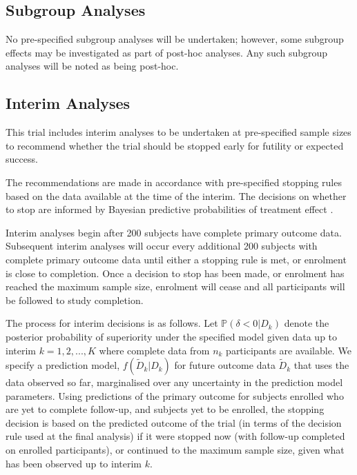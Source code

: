 \documentclass{bmcart}
\begin{document}
\subsection*{Subgroup Analyses}

No pre-specified subgroup analyses will be undertaken; however, some subgroup effects may be investigated as part of post-hoc analyses.
Any such subgroup analyses will be noted as being post-hoc.

\subsection*{Interim Analyses}

This trial includes interim analyses to be undertaken at pre-specified sample sizes to recommend whether the trial should be stopped early for futility or expected success.

The recommendations are made in accordance with pre-specified stopping rules based on the data available at the time of the interim.
The decisions on whether to stop are informed by Bayesian predictive probabilities of treatment effect \cite{spiegelhalter2004bayesian}.

Interim analyses begin after 200 subjects have complete primary outcome data.
Subsequent interim analyses will occur every additional 200 subjects with complete primary outcome data until either a stopping rule is met, or enrolment is close to completion.
Once a decision to stop has been made, or enrolment has reached the maximum sample size, enrolment will cease and all participants will be followed to study completion.

The process for interim decisions is as follows.
Let $\mathbb P(\delta < 0|D_k)$ denote the posterior probability of superiority under the specified model given data up to interim $k=1,2,...,K$ where complete data from $n_k$ participants are available.
We specify a prediction model, $f(\tilde D_k|D_k)$ for future outcome data $\tilde D_k$ that uses the data observed so far, marginalised over any uncertainty in the prediction model parameters.
Using predictions of the primary outcome for subjects enrolled who are yet to complete follow-up, and subjects yet to be enrolled, the stopping decision is based on the predicted outcome of the trial (in terms of the decision rule used at the final analysis) if it were stopped now (with follow-up completed on enrolled participants), or continued to the maximum sample size, given what has been observed up to interim $k$.
\end{document}
